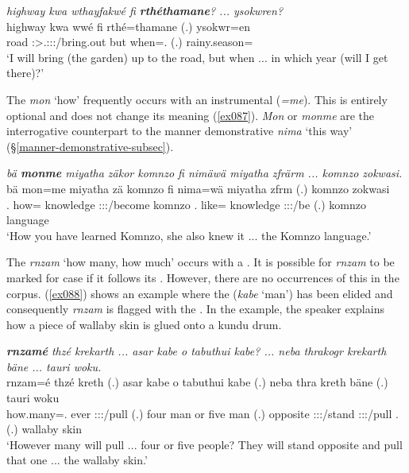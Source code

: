 \begin{exe}
	\ex \emph{highway kwa wthayfakwé fi \textbf{rthéthamane}? ... ysokwren?}\\
	\gll highway kwa wwé fi rthé=thamane (.) ysokwr=en\\
	road {\Fut} \Fsg:\Sbj>\Tsg.\F:\Obj:\Nonpast:\Ipfv/bring.out but when=\Temp{}.{\Poss} (.) rainy.season={\Loc}\\
	\trans `I will bring (the garden) up to the road, but when ... in which year (will I get there)?' 
	\label{ex086}
\end{exe}%

The   \emph{mon} `how' frequently occurs with an instrumental  (\emph{=me}). This is entirely optional and does not change its meaning (\ref{ex087}). \emph{Mon} or \emph{monme} are the interrogative counterpart to the manner demonstrative \emph{nima} `this way' (\S\ref{manner-demonstrative-subsec}).

\begin{exe}
	\ex \emph{bä \textbf{monme} miyatha zäkor komnzo fi nimäwä miyatha zfrärm ... komnzo zokwasi.}\\
	\gll bä mon=me miyatha zä komnzo fi nima=wä miyatha zfrm (.) komnzo zokwasi\\
	\Second.{\Abs} how={\Ins} knowledge \Stsg:\Sbj:\Rpst:\Pfv/become komnzo \Third.{\Abs} like={\Emph} knowledge \Tsg\F{}:\Sbj:\Pst:\Dur{}/be (.) komnzo language\\
	\trans `How you have learned Komnzo, she also knew it ... the Komnzo language.' 
	\label{ex087}
\end{exe}%

The   \emph{rnzam} `how many, how much' occurs with a  . It is possible for \emph{rnzam} to be marked for case if it follows its . However, there are no occurrences of this in the corpus. (\ref{ex088}) shows an example where the   (\emph{kabe} `man') has been elided and consequently \emph{rnzam} is flagged with the  . In the example, the speaker explains how a piece of wallaby skin is glued onto a kundu drum.

\begin{exe}
	\ex \emph{\textbf{rnzamé} thzé krekarth ... asar kabe o tabuthui kabe? ... neba thrakogr krekarth bäne ... tauri woku.}\\
	\gll rnzam=é thzé kreth (.) asar kabe o tabuthui kabe (.) neba thra kreth bäne (.) tauri woku\\
	how.many=\Erg.{\Nsg} ever \Stpl:\Sbj:\Irr:\Pfv/pull (.) four man or five man (.) opposite \Stpl:\Sbj:\Irr:\Stat/stand \Stpl:\Sbj:\Irr:\Pfv/pull \Recog.{\Abs} (.) wallaby skin\\
	\trans `However many will pull ... four or five people? They will stand opposite and pull that one ... the wallaby skin.' 
	\label{ex088}
\end{exe}%

